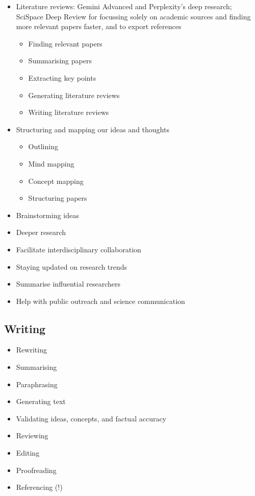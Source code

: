 \documentclass[
  10t,
]{article}
\providecommand{\tightlist}{%
  \setlength{\itemsep}{0pt}\setlength{\parskip}{0pt}}
\begin{document}
\begin{itemize}
\tightlist
\item
  Literature reviews: Gemini Advanced and Perplexity's deep research;
  SciSpace Deep Review for focussing solely on academic sources and
  finding more relevant papers faster, and to export references

  \begin{itemize}
  \tightlist
  \item
    Finding relevant papers
  \item
    Summarising papers
  \item
    Extracting key points
  \item
    Generating literature reviews
  \item
    Writing literature reviews
  \end{itemize}
\item
  Structuring and mapping our ideas and thoughts

  \begin{itemize}
  \tightlist
  \item
    Outlining
  \item
    Mind mapping
  \item
    Concept mapping
  \item
    Structuring papers
  \end{itemize}
\item
  Brainstorming ideas
\item
  Deeper research
\item
  Facilitate interdisciplinary collaboration
\item
  Staying updated on research trends
\item
  Summarise influential researchers
\item
  Help with public outreach and science communication
\end{itemize}

\subsection{Writing}\label{writing}

\begin{itemize}
\tightlist
\item
  Rewriting
\item
  Summarising
\item
  Paraphrasing
\item
  Generating text
\item
  Validating ideas, concepts, and factual accuracy
\item
  Reviewing
\item
  Editing
\item
  Proofreading
\item
  Referencing (!)
\end{itemize}
\end{document}
